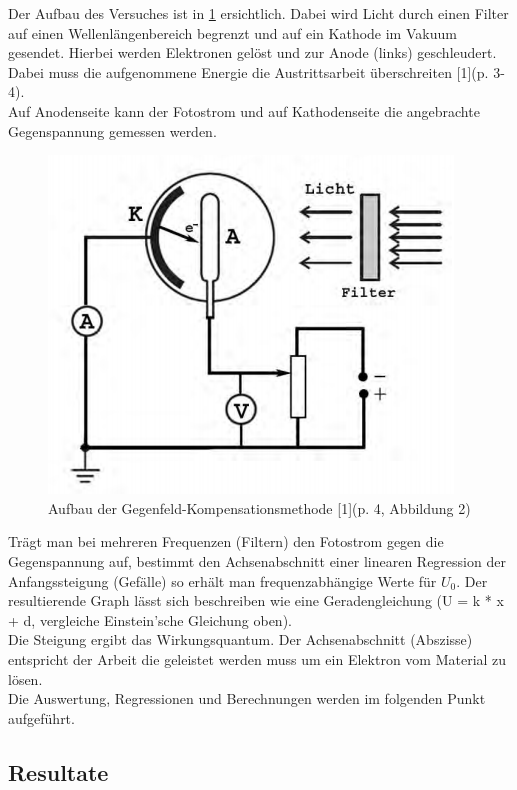\documentclass[12pt,a4paper]{article}
\begin{document}
\begin{multicols}{2}
\noindent 
Der Aufbau des Versuches ist in \ref{fig:Plank_Aufbau} ersichtlich. Dabei wird Licht durch einen Filter auf einen Wellenlängenbereich begrenzt und auf ein Kathode im Vakuum gesendet. Hierbei werden Elektronen gelöst und zur Anode (links) geschleudert. Dabei muss die aufgenommene Energie die Austrittsarbeit überschreiten [1](p. 3-4).\\
Auf Anodenseite kann der Fotostrom und auf Kathodenseite die angebrachte Gegenspannung gemessen werden.

\begin{figure}[H]
	\centering
	\includegraphics[scale=0.5]{./data/Planck_Aufbau.png}
	\caption{Aufbau der Gegenfeld-Kompensationsmethode [1](p. 4, Abbildung 2)}
	\label{fig:Plank_Aufbau}
\end{figure}

\noindent 
Trägt man bei mehreren Frequenzen (Filtern) den Fotostrom gegen die Gegenspannung auf, bestimmt den Achsenabschnitt einer linearen Regression der Anfangssteigung (Gefälle) so erhält man frequenzabhängige Werte für $U_0$. 
Der resultierende Graph lässt sich beschreiben wie eine Geradengleichung (U = k * x + d, vergleiche Einstein'sche Gleichung oben).\\
Die Steigung ergibt das Wirkungsquantum. Der Achsenabschnitt (Abszisse) entspricht der Arbeit die geleistet werden muss um ein Elektron vom Material zu lösen. \\
Die Auswertung, Regressionen und Berechnungen werden im folgenden Punkt aufgeführt.

\end{multicols}
\subsection{Resultate}
\end{document}
